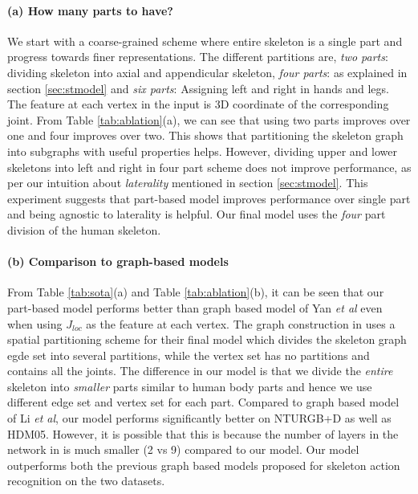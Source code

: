\documentclass{bmvc2k}
\def\etal{\emph{et al}\bmvaOneDot}
\begin{document}
\paragraph{(a) How many parts to have?} We start with a coarse-grained scheme where entire skeleton is a single part and progress towards finer representations. The different partitions are, \textit{two parts}: dividing skeleton into axial and appendicular skeleton, \textit{four parts}: as explained in section \ref{sec:stmodel} and \textit{six parts}: Assigning left and right in hands and legs. The feature at each vertex in the input is 3D coordinate of the corresponding joint. From Table \ref{tab:ablation}(a), we can see that using two parts improves over one and four improves over two. This shows that partitioning the skeleton graph into subgraphs with useful properties helps. However, dividing upper and lower skeletons into left and right in four part scheme does not improve performance, as per our intuition about \textit{laterality} mentioned in section \ref{sec:stmodel}. This experiment suggests that part-based model improves performance over single part and being agnostic to laterality is helpful. Our final model uses the \textit{four} part division of the human skeleton.

\paragraph{(b) Comparison to graph-based models} From Table \ref{tab:sota}(a) and Table \ref{tab:ablation}(b), it can be seen that our part-based model performs better than graph based model of Yan \etal \cite{yan2018spatial} even when using $J_{loc}$ as the feature at each vertex. The graph construction in \cite{yan2018spatial} uses a spatial partitioning scheme for their final model which divides the skeleton graph egde set into several partitions, while the vertex set has no partitions and contains all the joints. The difference in our model is that we divide the \textit{entire} skeleton into \textit{smaller} parts similar to human body parts and hence we use different edge set and vertex set for each part. Compared to graph based model of Li \etal \cite{li2018spatio}, our model performs significantly better on NTURGB+D as well as HDM05. However, it is possible that this is because the number of layers in the network in \cite{li2018spatio} is much smaller (2 vs 9) compared to our model. Our model outperforms both the previous graph based models proposed for skeleton action recognition on the two datasets.
\end{document}

